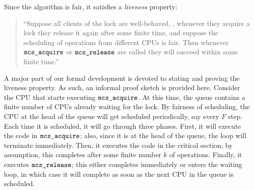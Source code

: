 Since the algorithm is fair, it satisfies a \textit{liveness} property:\begin{quote}
``Suppose all clients of the lock are well-behaved, \ie, whenever they acquire a lock they release it again after some finite time, and suppose the scheduling of operations from different CPUs is fair. Then  whenever ${\mathrm{\texttt{mcs\_acquire}}}$ or ${\mathrm{\texttt{mcs\_release}}}$ are called they will succeed within some finite time.''
\end{quote}
A major part of our formal development is devoted to stating and proving the liveness property. 
As such, an informal proof sketch is provided here. Consider the CPU that starts executing 
 ${\mathrm{\texttt{mcs\_acquire}}}$.
At this time, the queue contains a finite number of CPUs already waiting for the lock.
By fairness of scheduling, the CPU at the head of the queue will get scheduled periodically, say every $F$ step. Each time it is scheduled, it will go through three phases. 
First, it will execute the code in ${\mathrm{\texttt{mcs\_acquire}}}$; also, since it is at the head of the queue, the loop will terminate immediately. 
Then, it executes the code in the critical section; 
by assumption, this completes after some finite number $k$ of operations. 
Finally, it executes ${\mathrm{\texttt{mcs\_release}}}$; this either completes immediately or enters the waiting loop, in which case it will complete as soon as the next CPU in the queue is scheduled.



